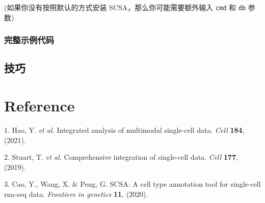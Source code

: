 \documentclass[
]{article}
\newenvironment{cslreferences}%
  {}%
  {\par}
\begin{document}
(如果你没有按照默认的方式安装 SCSA，那么你可能需要额外输入 \texttt{cmd} 和 \texttt{db} 参数)

\hypertarget{ux5b8cux6574ux793aux4f8bux4ee3ux7801}{%
\subsubsection{完整示例代码}\label{ux5b8cux6574ux793aux4f8bux4ee3ux7801}}

\hypertarget{ux6280ux5de7}{%
\subsection{技巧}\label{ux6280ux5de7}}

\hypertarget{bibliography}{%
\section*{Reference}\label{bibliography}}

\hypertarget{refs}{}
\begin{cslreferences}
\leavevmode\hypertarget{ref-IntegratedAnalHaoY2021}{}%
1. Hao, Y. \emph{et al.} Integrated analysis of multimodal single-cell data. \emph{Cell} \textbf{184}, (2021).

\leavevmode\hypertarget{ref-ComprehensiveIStuart2019}{}%
2. Stuart, T. \emph{et al.} Comprehensive integration of single-cell data. \emph{Cell} \textbf{177}, (2019).

\leavevmode\hypertarget{ref-ScsaACellTyCaoY2020}{}%
3. Cao, Y., Wang, X. \& Peng, G. SCSA: A cell type annotation tool for single-cell rna-seq data. \emph{Frontiers in genetics} \textbf{11}, (2020).
\end{cslreferences}
\end{document}
